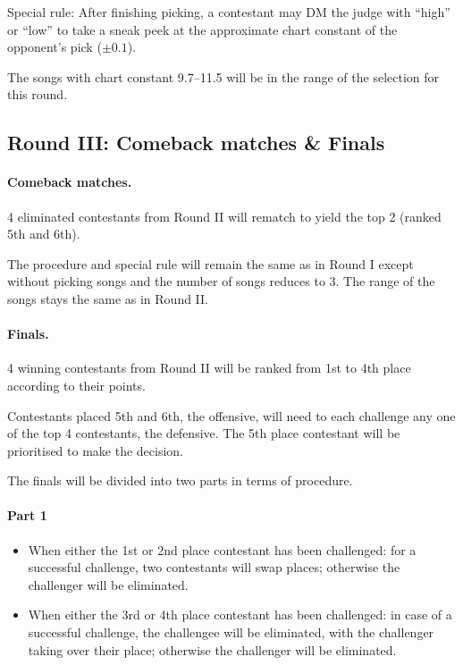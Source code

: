 \documentclass{article}
\newcommand{\alert}[1]{{\color{red} #1}}
\newcommand{\srbgcolor}{red!40}
\newcommand{\specialrule}[1]{\hfuzz=100pt  %
	\colorbox{\srbgcolor}{\parbox{\textwidth}{#1}}}
\begin{document}
\specialrule{
	Special rule: After finishing picking,
	a contestant may DM the judge with ``high'' or ``low''
	to take a sneak peek at
	the approximate chart constant of the opponent's pick
	($\pm0.1$).
}

\nopagebreak

\alert{
	The songs with chart constant 9.7--11.5
	will be in the range of the selection for this round.
}

\subsection{Round III: Comeback matches \& Finals}

\paragraph{Comeback matches.}
4 eliminated contestants
from Round II will rematch to yield the top 2
(ranked 5th and 6th).

The procedure and \colorbox{\srbgcolor}{special rule}
will remain the same as in Round I
except without picking songs
and the number of songs reduces to 3.
The range of the songs stays the same as in Round II.

\paragraph{Finals.}
4 winning contestants from Round II
will be ranked from 1st to 4th place
according to their points.

Contestants placed 5th and 6th, the offensive,
will need to each challenge any
one of the top 4 contestants, the defensive.
The 5th place contestant will be prioritised to make the decision.

The finals will be divided into two parts in terms of procedure.

\paragraph{Part 1}

\begin{itemize}
	\item When either the 1st or 2nd place contestant has been challenged:
	      for a successful challenge, two contestants will swap places;
	      otherwise the challenger will be eliminated.

	\item When either the 3rd or 4th place contestant has been challenged:
	      in case of a successful challenge, the challengee
	      will be eliminated, with the challenger taking over
	      their place; otherwise the challenger will be eliminated.
\end{itemize}
\end{document}
